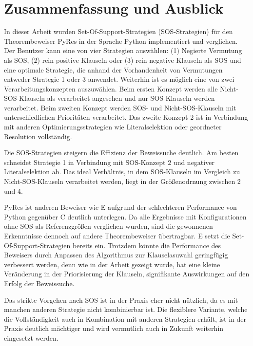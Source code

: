
\chapter{Zusammenfassung und Ausblick}

In dieser Arbeit wurden Set-Of-Support-Strategien (SOS-Strategien) für den Theorembeweiser PyRes in der Sprache Python implementiert und verglichen. Der Benutzer kann eine von vier Strategien auswählen: (1) Negierte Vermutung als SOS, (2) rein positive Klauseln oder (3) rein negative Klauseln als SOS und eine optimale Strategie, die anhand der Vorhandenheit von Vermutungen entweder Strategie 1 oder 3 anwendet. Weiterhin ist es möglich eine von zwei Verarbeitungskonzepten auszuwählen. Beim ersten Konzept werden alle Nicht-SOS-Klauseln als verarbeitet angesehen und nur SOS-Klauseln werden verarbeitet. Beim zweiten Konzept werden SOS- und Nicht-SOS-Klauseln mit unterschiedlichen Prioritäten verarbeitet. Das zweite Konzept 2 ist in Verbindung mit anderen Optimierungsstrategien wie Literalselektion oder geordneter Resolution vollständig. 

Die SOS-Strategien steigern die Effizienz der Beweissuche deutlich. Am besten schneidet Strategie 1 in Verbindung mit SOS-Konzept 2 und negativer Literalselektion ab. Das ideal Verhältnis, in dem SOS-Klauseln im Vergleich zu Nicht-SOS-Klauseln verarbeitet werden, liegt in der Größenodrnung zwischen 2 und 4. 

PyRes ist anderen Beweiser wie E aufgrund der schlechteren Performance von Python gegenüber C deutlich unterlegen. Da alle Ergebnisse mit Konfigurationen ohne SOS als Referenzgrößen verglichen wurden, sind die gewonnenen Erkenntnisse dennoch auf andere Theorembeweiser übertragbar. E setzt die Set-Of-Support-Strategien bereits ein. Trotzdem könnte die Performance des Beweisers durch Anpassen des Algorithmus zur Klauselasuwahl geringfügig verbessert werden, denn wie in der Arbeit gezeigt wurde, hat eine kleine Veränderung in der Priorisierung der Klauseln, signifikante Auswirkungen auf den Erfolg der Beweissuche.

Das strikte Vorgehen nach SOS ist in der Praxis eher nicht nützlich, da es mit manchen anderen Strategie nicht kombinierbar ist. Die flexiblere Variante, welche die Vollständigkeit auch in Kombination mit anderen Strategien erhält, ist in der Praxis deutlich mächtiger und wird vermutlich auch in Zukunft weiterhin eingesetzt werden.